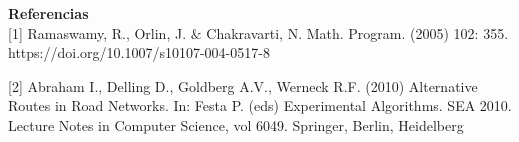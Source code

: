 \documentclass[10pt]{report}
\begin{document}
\textbf{Referencias}\\

[1] Ramaswamy, R., Orlin, J. $\&$ Chakravarti, N. Math. Program. (2005) 102: 355. https://doi.org/10.1007/s10107-004-0517-8

[2] Abraham I., Delling D., Goldberg A.V., Werneck R.F. (2010) Alternative Routes in Road Networks. In: Festa P. (eds) Experimental Algorithms. SEA 2010. Lecture Notes in Computer Science, vol 6049. Springer, Berlin, Heidelberg
\end{document}
